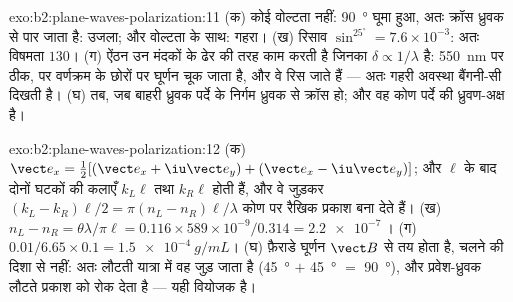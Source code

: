 \begin{solution}{exo:b2:plane-waves-polarization:11}
(क) कोई वोल्टता नहीं: \qty{90}{\degree} घूमा हुआ, अतः क्रॉस ध्रुवक से पार जाता है:
उजला; और वोल्टता के साथ: गहरा। (ख) रिसाव $\sin^25^\circ = 7.6 \times 10^{-3}$: अतः विषमता
$130$। (ग) ऐंठन उन मंदकों के ढेर की तरह काम करती है जिनका $\delta \propto 1/\lambda$ है:
\qty{550}{nm} पर ठीक, पर वर्णक्रम के छोरों पर घूर्णन चूक जाता है,
और वे रिस जाते हैं --- अतः गहरी अवस्था बैंगनी-सी दिखती है। (घ) तब, जब बाहरी
ध्रुवक पर्दे के निर्गम ध्रुवक से क्रॉस हो; और वह कोण
पर्दे की ध्रुवण-अक्ष है।
\end{solution}

\begin{solution}{exo:b2:plane-waves-polarization:12}
(क) $\vect e_x = \tfrac12[(\vect e_x + \iu\vect e_y) + (\vect e_x - \iu\vect e_y)]$; और $\ell$ के बाद
दोनों घटकों की कलाएँ $k_L\ell$ तथा $k_R\ell$ होती हैं, और वे जुड़कर
$(k_L - k_R)\ell/2 = \pi(n_L - n_R)\ell/\lambda$ कोण पर रैखिक प्रकाश बना देते हैं। (ख) $n_L -
n_R = \theta\lambda/\pi\ell = 0.116 \times 589 \times 10^{-9}/0.314 = \qty{2.2e-7}{}$। (ग)
$0.01/6.65 \times 0.1 = \qty{1.5e-4}{g/mL}$। (घ) फ़ैराडे घूर्णन $\vect B$ से तय होता
है, चलने की दिशा से नहीं: अतः लौटती यात्रा में वह जुड़ जाता है
(\qty{45}{\degree} $+$ \qty{45}{\degree} $=$ \qty{90}{\degree}), और प्रवेश-ध्रुवक लौटते प्रकाश को
रोक देता है --- यही वियोजक है।
\end{solution}

